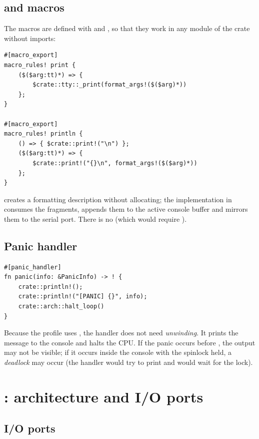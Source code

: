 \subsection{ and  macros}

The macros are defined with  and , so that
they work in any module of the crate without imports:

\begin{lstlisting}[caption={Printing macros without allocation.},label={lst:macros}]
#[macro_export]
macro_rules! print {
    ($($arg:tt)*) => {
        $crate::tty::_print(format_args!($($arg)*))
    };
}

#[macro_export]
macro_rules! println {
    () => { $crate::print!("\n") };
    ($($arg:tt)*) => {
        $crate::print!("{}\n", format_args!($($arg)*))
    };
}
\end{lstlisting}

 creates a formatting description without allocating;
the  implementation in  consumes the fragments,
appends them to the active console buffer and mirrors them to the serial port.
There is no  (which would require ).

\subsection{Panic handler}

\begin{lstlisting}[caption={\emph{Panic handler} of the kernel.},label={lst:panic}]
#[panic_handler]
fn panic(info: &PanicInfo) -> ! {
    crate::println!();
    crate::println!("[PANIC] {}", info);
    crate::arch::halt_loop()
}
\end{lstlisting}

Because the profile uses , the handler does not need
\emph{unwinding}. It prints the message to the console and halts the CPU. If the
panic occurs before , the output may not be
visible; if it occurs inside the console with the spinlock held, a
\emph{deadlock} may occur (the handler would try to print and would wait for the lock).

\section{: architecture and I/O ports}

\subsection{I/O ports}

